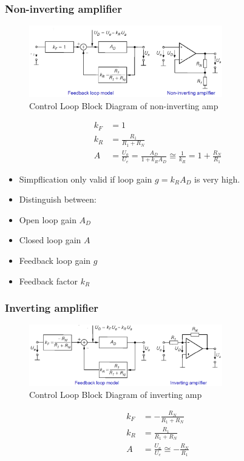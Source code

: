 	\subsubsection{Non-inverting amplifier}
		\begin{figure}[h]
			\centering
			\includegraphics[width=0.75\textwidth]{images/ControlLoopNonInvertingDiagram.png}
			\caption{Control Loop Block Diagram of non-inverting amp}
			\label{Fig:ControlLoopNonInvertingDiagram}
		\end{figure}
		\begin{align}
			k_F &= 1 \\
			k_R &= \frac{R_1}{R_1 + R_N} \\
			A &= \frac{U_a}{U_e} = \frac{A_D}{1 + k_R A_D} \cong \frac{1}{k_R} = 1 + \frac{R_N}{R_1}
		\end{align}
		\begin{itemize}
			\setlength{\itemsep}{-5pt}
			\item Simpflication only valid if loop gain $g = k_R A_D$ is very high. 
			\item Distinguish between:
			\item[] Open loop gain \textbf{$A_D$}
			\item[] Closed loop gain \textbf{$A$}
			\item[] Feedback loop gain \textbf{$g$}
			\item[] Feedback factor \textbf{$k_R$ }
		\end{itemize}
	\subsubsection{Inverting amplifier}
		\begin{figure}[h]
			\centering
			\includegraphics[width=0.75\textwidth]{images/ControlLoopInvertingDiagram.png}
			\caption{Control Loop Block Diagram of inverting amp}
			\label{Fig:ControlLoopInvertingDiagram}
		\end{figure}
		\begin{align}
			k_F &= -\frac{R_N}{R_1 + R_N} \\
			k_R &= \frac{R_1}{R_1 + R_N} \\
			A &= \frac{U_a}{U_e} \cong -\frac{R_N}{R_1}
		\end{align}
	
